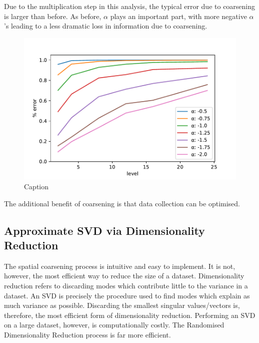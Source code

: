 \documentclass{acm_proc_article-sp}
\begin{document}
Due to the multiplication step in this analysis, the typical error due to coarsening is larger than before. As before, $\alpha$ plays an important part, with more negative $\alpha$'s leading to a less dramatic loss in information due to coarsening.

\begin{figure}[h]
\begin{center}
\includegraphics[scale=0.5]{Results/plotProductSpatialTemporalFieldsViaCoarsening.pdf}
\caption[Small caption]{Caption}
\label{fig:plotProductSpatialTemporalFieldsViaCoarsening}
\end{center}
\end{figure}

The additional benefit of coarsening is that data collection can be optimised.

\subsection{Approximate SVD via Dimensionality Reduction}
\label{sec:Techniques Approximate SVD via Dimensionality Reduction}

The spatial coarsening process is intuitive and easy to implement. It is not, however, the most efficient way to reduce the size of a dataset. Dimensionality reduction refers to discarding modes which contribute little to the variance in a dataset. An SVD is precisely the procedure used to find modes which explain as much variance as possible. Discarding the smallest singular values/vectors is, therefore, the most efficient form of dimensionality reduction. Performing an SVD on a large dataset, however, is computationally costly. The Randomised Dimensionality Reduction process is far more efficient.
\end{document}
